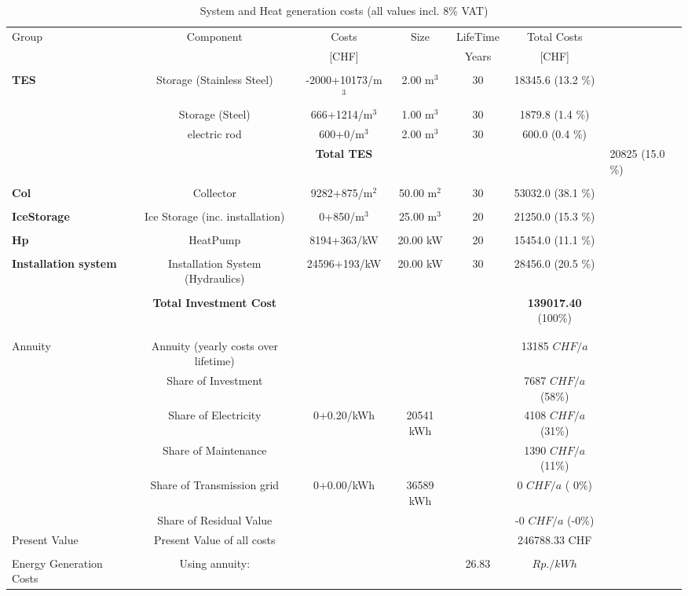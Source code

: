 \documentclass[english]{SPFShortReport}
\begin{document}
\begin{table}[!ht]
\centering
\caption{System and Heat generation costs (all values incl. 8$\%$ VAT) }
\begin{adjustbox}{max width =\textwidth}
\begin{tabular}{l | c c c c c } 
\hline
\hline
Group &Component &Costs &Size &LifeTime &Total Costs \\ 
 & &[CHF] & &Years &[CHF]\\ 
\hline
\\ 
\textbf{TES} & Storage (Stainless Steel) & -2000+10173/m$^3$ & 2.00 m$^3$ &30 & 18345.6 (13.2 \%) \\ 
 & Storage (Steel) & 666+1214/m$^3$ & 1.00 m$^3$ &30 & 1879.8 (1.4 \%) \\ 
 & electric rod & 600+0/m$^3$ & 2.00 m$^3$ &30 & 600.0 (0.4 \%) \\ 
& 
 &\textbf{Total TES} &  & & & 20825 (15.0 \%) \\ 
\hline \\ 
\textbf{Col} & Collector & 9282+875/m$^2$ & 50.00 m$^2$ &30 & 53032.0 (38.1 \%) \\ 
\hline \\ 
\textbf{IceStorage} & Ice Storage (inc. installation) & 0+850/m$^3$ & 25.00 m$^3$ &20 & 21250.0 (15.3 \%) \\ 
\hline \\ 
\textbf{Hp} & HeatPump & 8194+363/kW & 20.00 kW &20 & 15454.0 (11.1 \%) \\ 
\hline \\ 
\textbf{Installation system} & Installation System (Hydraulics) & 24596+193/kW & 20.00 kW &30 & 28456.0 (20.5 \%) \\ 
\hline \\ 
 & \textbf{Total Investment Cost} & && &\textbf{139017.40} (100\%) \\ 
\hline \\ 
\hline \\ 
Annuity & Annuity (yearly costs over lifetime)  &&& & 13185 $CHF/a$  \\ 
 & Share of Investment & &&& 7687 $CHF/a$ (58\%) \\ 
 & Share of Electricity  & 0+0.20/kWh & 20541 kWh&  & 4108 $CHF/a$ (31\%)\\ 
 & Share of Maintenance & &&& 1390 $CHF/a$ (11\%)\\ 
 & Share of Transmission grid & 0+0.00/kWh & 36589  kWh & &  0 $CHF/a$ ( 0\%)\\ 
 & Share of Residual Value &&& & -0 $CHF/a$ (-0\%)\\ 
Present Value  & Present Value of all costs  & &&& 246788.33 CHF  \\ 
\hline \\ 
 Energy Generation Costs & Using annuity: &&& 26.83 & $Rp./kWh$ \\ 
\hline
\hline
\end{tabular}
\end{adjustbox}
\label{CostsTable}
\end{table}
\end{document}
